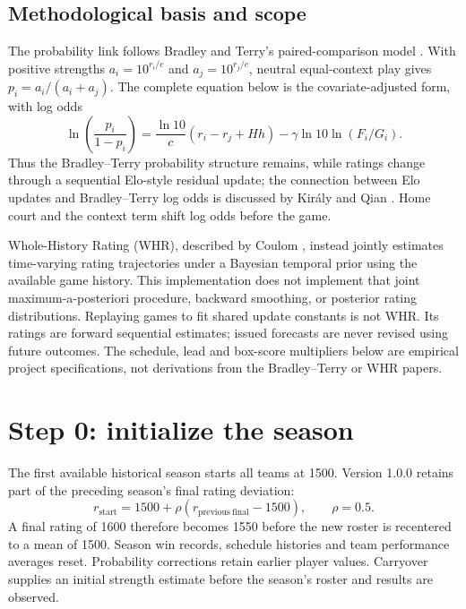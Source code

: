 \documentclass[11pt]{article}
\begin{document}
\subsection{Methodological basis and scope}
The probability link follows Bradley and Terry's paired-comparison model
\cite{bradleyterry}. With positive strengths $a_i=10^{r_i/c}$ and
$a_j=10^{r_j/c}$, neutral equal-context play gives
$p_i=a_i/(a_i+a_j)$. The complete equation below is the covariate-adjusted
form, with log odds
\begin{equation}
 \ln\!\left(\frac{p_i}{1-p_i}\right)=\frac{\ln 10}{c}(r_i-r_j+Hh)
 -\gamma\ln 10\ln(F_i/G_i).
\end{equation}
Thus the Bradley--Terry probability structure remains, while ratings change
through a sequential Elo-style residual update; the connection between
Elo updates and Bradley--Terry log odds is discussed by Kir\'aly and Qian
\cite{onlineelo}. Home court and the context
term shift log odds before the game.

Whole-History Rating (WHR), described by Coulom \cite{whr}, instead jointly
estimates time-varying rating trajectories under a Bayesian temporal prior
using the available game history. This implementation does not implement
that joint maximum-a-posteriori procedure, backward smoothing, or posterior
rating distributions. Replaying games to fit shared update constants is not
WHR. Its ratings are forward sequential estimates; issued forecasts are
never revised using future outcomes. The schedule, lead and box-score
multipliers below are empirical project specifications, not derivations
from the Bradley--Terry or WHR papers.

\section{Step 0: initialize the season}
The first available historical season starts all teams at 1500. Version 1.0.0
retains part of the preceding season's final rating deviation:
\begin{equation}\label{eq:carryover}
 r_{\mathrm{start}}=1500+\rho(r_{\mathrm{previous\ final}}-1500),\qquad \rho=0.5.
\end{equation}
A final rating of 1600 therefore becomes 1550 before the new roster is
recentered to a mean of 1500. Season win records,
schedule histories and team performance averages reset. Probability
corrections retain earlier player values. Carryover supplies an initial
strength estimate before the season's roster and results are observed.
\end{document}
